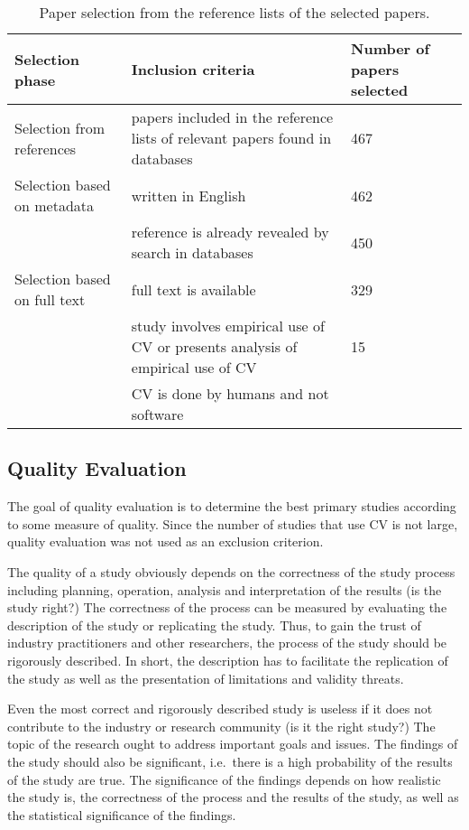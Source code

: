 
%
\begin{table}
	\scriptsize
\caption{\label{tab:Paper-Selection-from}Paper selection from the reference lists of the selected papers.}

\begin{tabular}{|>{\raggedright}p{}|>{\raggedright}p{}|>{\raggedright}p{}|}
\hline 
Selection phase & Inclusion criteria & Number of papers selected\tabularnewline
\hline\hline
Selection from references & papers included in the reference lists of relevant papers found in databases & 467 \tabularnewline
\hline 


Selection based on metadata & written in English & 462 \tabularnewline
\cline{2-3}
& reference is already revealed by search in databases & 450 \tabularnewline
\hline
Selection based on full text & full text is available  & 329 \tabularnewline
\cline{2-3}
& study involves empirical use of CV or presents analysis of empirical use of CV & 15 \tabularnewline
\cline{2-2}
& CV is done by humans and not software & \tabularnewline
\hline


\end{tabular}%
\end{table}


\subsection{\label{QE}Quality Evaluation}
The goal of quality evaluation is to determine the best primary studies according to some measure of quality.
Since the number of studies that use CV is not large, quality evaluation was not used as an exclusion criterion.

The quality of a study obviously depends on the correctness of the study process including planning, operation, analysis and interpretation of the results (is the study right?) The correctness of the process can be measured by evaluating the description of the study or replicating the study. Thus, to gain the trust of industry practitioners and other researchers, the process of the study should be rigorously described. In short, the description has to facilitate the replication of the study as well as the presentation of limitations and validity threats.

Even the most correct and rigorously described study is useless if it does not contribute to the industry or research community (is it the right study?) The topic of the research ought to address important goals and issues. The findings of the study should also be significant, i.e.\ there is a high probability of the results of the study are true. The significance of the findings depends on how realistic the study is, the correctness of the process and the results of the study, as well as the statistical significance of the findings.

